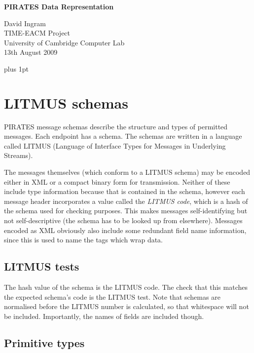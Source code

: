 \documentclass[12pt,a4paper,twoside]{article}
\renewcommand{\_}{\texttt{\symbol{95}}}
\begin{document}
\centerline{\textbf{\LARGE PIRATES Data Representation}}
\begin{center} \large
David Ingram\\
TIME-EACM Project\\
University of Cambridge Computer Lab\\
13th August 2009\\
\end{center}

{ \parskip 1mm plus 1pt \tableofcontents }
\pagestyle{fancy}

\section{LITMUS schemas}

PIRATES message schemas describe the structure and types of permitted messages.
Each endpoint has a schema. The schemas are written in a language called
LITMUS (Language of Interface Types for Messages in Underlying Streams).

The messages themselves (which conform to a LITMUS schema) may be encoded
either in XML or a compact binary form for transmission. Neither of these
include type information because that is contained in the schema, however each
message header incorporates a value called the \textit{LITMUS code}, which is
a hash of the schema used for checking purposes. This makes messages
self-identifying but not self-descriptive (the schema has to be looked up from
elsewhere). Messages encoded as XML obviously also include some redundant field
name information, since this is used to name the tags which wrap data.


\subsection{LITMUS tests}

The hash value of the schema is the LITMUS code. The check that this matches
the expected schema's code is the LITMUS test. Note that schemas are normalised
before the LITMUS number is calculated, so that whitespace will not be
included. Importantly, the names of fields are included though.

\subsection{Primitive types}
\end{document}

